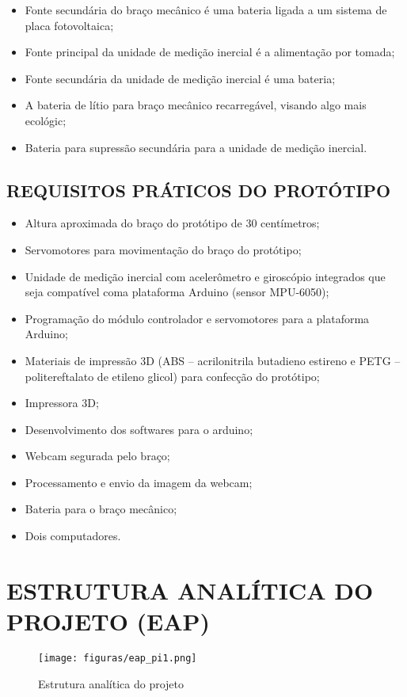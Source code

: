 \begin{itemize}
\item Fonte secundária do braço mecânico é uma bateria ligada a um sistema de placa fotovoltaica;
\item Fonte principal da unidade de medição inercial é a alimentação por tomada;
\item Fonte secundária da unidade de medição inercial é uma bateria;
\item A bateria de lítio para braço mecânico recarregável, visando algo mais ecológic; 
\item Bateria para supressão secundária para a unidade de medição inercial.
\end{itemize}

\subsection{REQUISITOS PRÁTICOS DO PROTÓTIPO}

\begin{itemize}
\item Altura aproximada do braço do protótipo de 30 centímetros;
\item Servomotores para movimentação do braço do protótipo;
\item Unidade de medição inercial com acelerômetro e giroscópio integrados que seja compatível coma plataforma Arduino (sensor MPU-6050);
\item Programação do módulo controlador e servomotores para a plataforma Arduino;
\item Materiais de impressão 3D (ABS – acrilonitrila butadieno estireno e PETG – politereftalato de etileno glicol) para confecção do protótipo;
\item Impressora 3D;
\item Desenvolvimento dos softwares para o arduino;
\item Webcam segurada pelo braço;
\item Processamento e envio da imagem da webcam;
\item Bateria para o braço mecânico;
\item Dois computadores.
\end{itemize}

\section{ESTRUTURA ANALÍTICA DO PROJETO (EAP)}

\begin{figure}[H]
	\centering
	\texttt{[image: figuras/eap\_pi1.png]}
	\caption{Estrutura analítica do projeto}
	\label{eap_fig01}
\end{figure}

